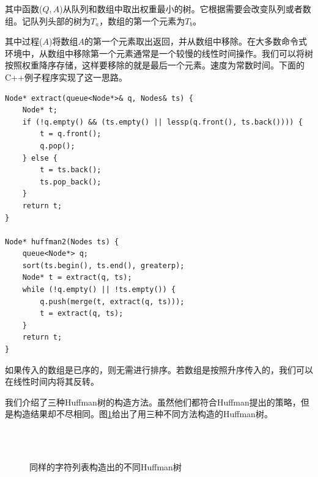 \documentclass[b5paper]{ctexart}
\begin{document}
其中函数($Q, A$)从队列和数组中取出权重最小的树。它根据需要会改变队列或者数组。记队列头部的树为$T_a$，数组的第一个元素为$T_b$。

\begin{algorithmic}[1]
    \State \Return {}
  \Else
    \State \Return {}
  \EndIf
\EndFunction
\end{algorithmic}

其中过程($A$)将数组$A$的第一个元素取出返回，并从数组中移除。在大多数命令式环境中，从数组中移除第一个元素通常是一个较慢的线性时间操作。我们可以将树按照权重降序存储，这样要移除的就是最后一个元素。速度为常数时间。下面的C++例子程序实现了这一思路。

\lstset{language=C++}
\begin{lstlisting}
Node* extract(queue<Node*>& q, Nodes& ts) {
    Node* t;
    if (!q.empty() && (ts.empty() || lessp(q.front(), ts.back()))) {
        t = q.front();
        q.pop();
    } else {
        t = ts.back();
        ts.pop_back();
    }
    return t;
}

Node* huffman2(Nodes ts) {
    queue<Node*> q;
    sort(ts.begin(), ts.end(), greaterp);
    Node* t = extract(q, ts);
    while (!q.empty() || !ts.empty()) {
        q.push(merge(t, extract(q, ts)));
        t = extract(q, ts);
    }
    return t;
}
\end{lstlisting}

如果传入的数组是已序的，则无需进行排序。若数组是按照升序传入的，我们可以在线性时间内将其反转。

我们介绍了三种Huffman树的构造方法。虽然他们都符合Huffman提出的策略，但是构造结果却不尽相同。图\ref{fig:huffman-vars}给出了用三种不同方法构造的Huffman树。

\begin{figure}[htbp]
 \centering
  \\
  \\
 \caption{同样的字符列表构造出的不同Huffman树}
 \label{fig:huffman-vars}
\end{figure}
\end{document}
